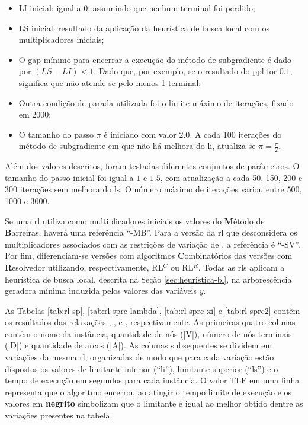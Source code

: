 \begin{itemize}
\item LI inicial: igual a 0, assumindo que nenhum terminal foi perdido;
\item LS  inicial: resultado da  aplicação da heurística  de busca local  com os
multiplicadores iniciais;
\item O gap mínimo para encerrar a execução do método de subgradiente é dado por
$(LS - LI) < 1$. Dado que, por exemplo, se o resultado do \gls{ppl} for ${0.1}$,
significa que não atende-se pelo menos 1 terminal;
\item  Outra condição  de parada  utilizada foi  o limite  máximo de  iterações,
fixado em 2000;
\item O tamanho do passo $\pi$ é  iniciado com valor $2.0$. A cada 100 iterações
do método de subgradiente em que não  há melhora do \gls{li}, atualiza-se $\pi =
\frac{\pi}{2}$.
\end{itemize}

Além dos valores descritos, foram testadas diferentes conjuntos de parâmetros. O
tamanho do  passo inicial foi igual  a $1$ e  $1.5$, com atualização a  cada 50,
150, 200 e 300  iterações sem melhora do \gls{ls}. O  número máximo de iterações
variou entre 500, 1000 e 3000.

Se  uma   \gls{rl}  utiliza   como  multiplicadores   iniciais  os   valores  do
\textbf{M}étodo  de \textbf{B}arreiras,  haverá uma  referência ``-MB''.  Para a
versão  da  \gls{rl}  que  desconsidera os  multiplicadores  associados  com  as
restrições  de  variação   de  {\delay},  a  referência  é   ``-SV''.  Por  fim,
diferenciam-se  versões com  algoritmos \textbf{C}ombinatórios  das versões  com
\textbf{R}esolvedor utilizando, respectivamente, RL$^{C}$  ou RL$^{R}$. Todas as
\gls{rl}s   aplicam   a  heurística   de   busca   local,  descrita   na   Seção
\ref{sec:heuristica-bl}, na arborescência geradora mínima induzida pelos valores
das variáveis $y$.

As  Tabelas  \ref{tab:rl-sp}, \ref{tab:rl-sprc-lambda},  \ref{tab:rl-sprc-xi}  e
\ref{tab:rl-sprc2}  contêm os  resultados das  relaxações {\rlu,  \rld, \rlt}  e
{\rlq}, respectivamente. As primeiras quatro colunas contêm o nome da instância,
quantidade de  nós (|V|), número  de nós terminais  (|D|) e quantidade  de arcos
(|A|).  As colunas  subsequentes  se  dividem em  variações  da mesma  \gls{rl},
organizadas  de modo  que  para  cada variação  estão  dispostos  os valores  de
limitante inferior  (``\gls{li}''), limitante superior (``\gls{ls}'')  e o tempo
de execução em segundos para cada instância. O valor TLE em uma linha representa
que o algoritmo encerrou  ao atingir o tempo limite de execução  e os valores em
\textbf{negrito} simbolizam que  o limitante é igual ao melhor  obtido dentre as
variações presentes na tabela.

